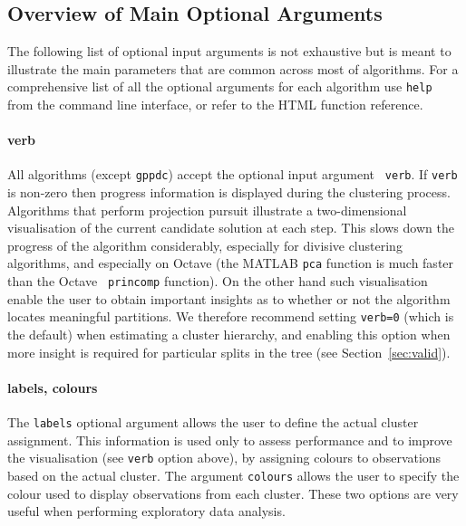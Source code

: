 \documentclass{book}
\begin{document}
\subsection*{Overview of Main Optional Arguments}


The following list of optional input arguments is not exhaustive but is meant to illustrate the main
parameters that are common across most of algorithms.
For a comprehensive list of all the optional arguments for each algorithm
use {\tt help } from the command line interface, or refer to the HTML
function reference.

\paragraph{verb}
%
All algorithms (except {\tt gppdc}) accept the optional input argument {\tt
verb}. If {\tt verb} is non-zero then progress information is
displayed during the clustering process. Algorithms that perform projection
pursuit illustrate a two-dimensional visualisation of the current candidate
solution at each step. This slows down the progress of the algorithm
considerably, especially for divisive clustering algorithms, and especially on
Octave (the MATLAB {\tt pca} function is much faster than the Octave {\tt
princomp} function). On the other hand such visualisation enable the user to
obtain important insights as to whether or not the algorithm locates meaningful
partitions. We therefore recommend setting {\tt verb=0} (which is the default)
when estimating a cluster hierarchy, and enabling this option when more insight
is required for particular splits in the tree (see Section~\ref{sec:valid}).

\paragraph{labels, colours}
%
The {\tt labels} optional argument allows the user to define the actual cluster
assignment. This information is used only to assess performance and to improve
the visualisation (see {\tt verb} option above), by assigning colours to
observations based on the actual cluster. The argument {\tt colours} allows the
user to specify the colour used to display observations from each cluster.
These two options are very useful when performing exploratory data analysis.
\end{document}
